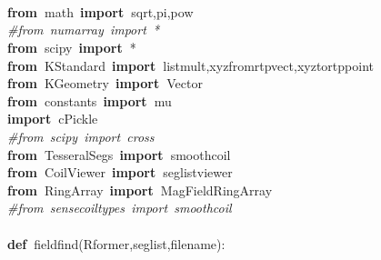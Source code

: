 \documentclass{article}
\newcommand{\hlstd}[1]{\textcolor[rgb]{0,0,0}{#1}}
\newcommand{\hlslc}[1]{\textcolor[rgb]{0.51,0.51,0.51}{\it{#1}}}
\newcommand{\hlsym}[1]{\textcolor[rgb]{0,0,0}{#1}}
\newcommand{\hlkwa}[1]{\textcolor[rgb]{0,0,0}{\bf{#1}}}
\newcommand{\hlkwb}[1]{\textcolor[rgb]{0.51,0,0}{#1}}
\newcommand{\hlkwd}[1]{\textcolor[rgb]{0,0,0.51}{#1}}
\begin{document}
\hlstd{}\hspace*{\fill}\\
\hspace*{\fill}\\
\hspace*{\fill}\\
\hlkwa{from\ }\hlstd{math\ }\hlkwa{import\ }\hlstd{sqrt}\hlsym{,}\hlstd{pi}\hlsym{,}\hlstd{}\hlkwb{pow}\hspace*{\fill}\\
\hlstd{}\hlslc{\#from\ numarray\ import\ {*}}\hspace*{\fill}\\
\hlstd{}\hlkwa{from\ }\hlstd{scipy\ }\hlkwa{import\ }\hlstd{}\hlsym{{*}}\hspace*{\fill}\\
\hlstd{}\hlkwa{from\ }\hlstd{KStandard\ }\hlkwa{import\ }\hlstd{listmult}\hlsym{,}\hlstd{xyz\textunderscore from\textunderscore rtp\textunderscore vect}\hlsym{,}\hlstd{xyz\textunderscore to\textunderscore rtp\textunderscore point}\hspace*{\fill}\\
\hlkwa{from\ }\hlstd{KGeometry\ }\hlkwa{import\ }\hlstd{Vector}\hspace*{\fill}\\
\hlkwa{from\ }\hlstd{constants\ }\hlkwa{import\ }\hlstd{mu}\hspace*{\fill}\\
\hlkwa{import\ }\hlstd{cPickle}\hspace*{\fill}\\
\hlslc{\#from\ scipy\ import\ cross}\hspace*{\fill}\\
\hlstd{}\hlkwa{from\ }\hlstd{TesseralSegs\ }\hlkwa{import\ }\hlstd{smoothcoil}\hspace*{\fill}\\
\hlkwa{from\ }\hlstd{CoilViewer\ }\hlkwa{import\ }\hlstd{seglistviewer}\hspace*{\fill}\\
\hlkwa{from\ }\hlstd{RingArray\ }\hlkwa{import\ }\hlstd{MagFieldRingArray}\hspace*{\fill}\\
\hlslc{\#from\ sensecoiltypes\ import\ smoothcoil}\hspace*{\fill}\\
\hlstd{}\hspace*{\fill}\\
\hlkwa{def\ }\hlstd{}\hlkwd{fieldfind}\hlstd{}\hlsym{(}\hlstd{Rformer}\hlsym{,}\hlstd{seglist}\hlsym{,}\hlstd{filename}\hlsym{):}\hspace*{\fill}\\
\end{document}
